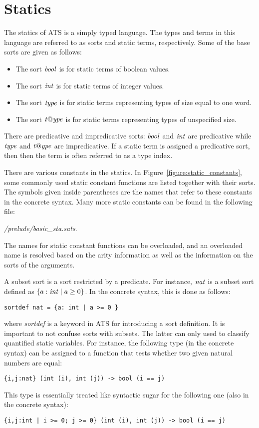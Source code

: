 \section{Statics}
The statics of ATS is a simply typed language. The types and terms in this
language are referred to as sorts and static terms, respectively. Some of
the base sorts are given as follows:
\begin{itemize}
\item The sort ${\it bool}$ is for static terms of boolean values.
\item The sort ${\it int}$ is for static terms of integer values.
\item The sort ${\it type}$ is for static terms representing types of size
equal to one word.
\item The sort ${\it t@ype}$ is for static terms representing types of
unspecified size.
\end{itemize}
There are predicative and impredicative sorts:
${\it bool}$ and ${\it int}$ are predicative while ${\it type}$ and ${\it t@ype}$ are
impredicative. If a static term is assigned a predicative sort, then
then the term is often referred to as a type index.

There are various constants in the statics.  In
Figure~\ref{figure:static_constants}, some commonly used static constant
functions are listed together with their sorts.  The symbols given inside
parentheses are the names that refer to these constants in the concrete
syntax. Many more static constants can be found in the following file:
\begin{center}
{\it\ATSHOME/prelude/basic\_sta.sats}.
\end{center}
The names for static constant functions can be overloaded, and an
overloaded name is resolved based on the arity information as well as the
information on the sorts of the arguments.

A subset sort is a sort restricted by a predicate. For instance, ${\it nat}$ is
a subset sort defined as $\{a:{\it int}\mid a\geq 0\}$. In the concrete syntax,
this is done as follows:
\begin{verbatim}
sortdef nat = {a: int | a >= 0 }
\end{verbatim}
where {\it sortdef} is a keyword in ATS for introducing a sort definition.
It is important to not confuse sorts with subsets. The latter can only used
to classify quantified static variables.  For instance, the following type
(in the concrete syntax)
can be assigned to a function that tests whether two given natural numbers
are equal:
\begin{verbatim}
{i,j:nat} (int (i), int (j)) -> bool (i == j)
\end{verbatim}
This type is essentially treated like syntactic sugar for the following
one (also in the concrete syntax):
\begin{verbatim}
{i,j:int | i >= 0; j >= 0} (int (i), int (j)) -> bool (i == j)
\end{verbatim}

